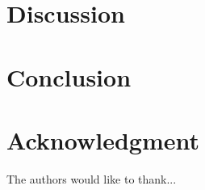 \documentclass[10pt,twocolumn]{article}
\begin{document}


\section{Discussion}
\label{sec:discussion}





\section{Conclusion}

\label{sec:conclusion}




\section*{Acknowledgment}


The authors would like to thank...


\printbibliography 
\end{document}
